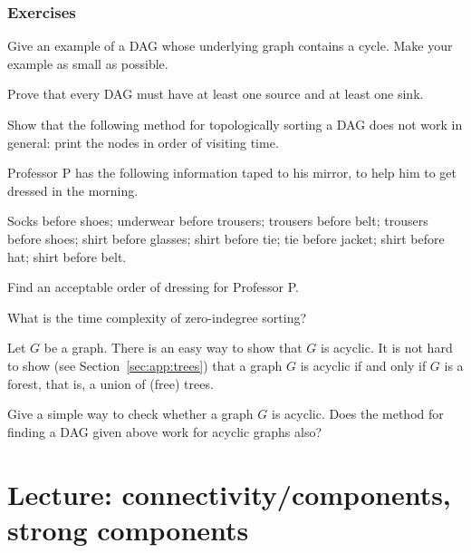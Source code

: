 \subsection*{Exercises}

\begin{Exercise}
\label{ex:DAG-vs-tree}
Give an example of a DAG whose underlying graph contains a cycle. Make
your example as small as possible.
\end{Exercise}

\begin{Exercise}
\label{ex:DAG-sink}
Prove that every DAG must have at least one source and at least one sink.
\end{Exercise}

\begin{Exercise}
\label{ex:sillytopsort}
Show that the following method for topologically sorting a DAG does not work in 
general: print the nodes in order of visiting time.
\end{Exercise}

\begin{Exercise} 
\label{ex:profP}
Professor P has the following information taped to his mirror, to help
him to get dressed in the morning.

Socks before shoes; underwear before trousers; trousers before belt;
trousers before shoes; shirt before glasses; shirt before tie; tie
before jacket; shirt before hat; shirt before belt.

Find an acceptable order of dressing for Professor P.
\end{Exercise}

\begin{Exercise}
\label{ex:zero-indeg-runtime}
What is the time complexity of zero-indegree sorting? 
\end{Exercise}


\begin{Exercise}
\label{ex:forest}
Let $G$ be a graph. There is an easy way to show that $G$ is acyclic.
It is not hard to show (see Section~\ref{sec:app:trees}) that a graph $G$ is 
acyclic if and only if $G$ is a forest, that is, a union of (free) trees.

Give a simple way to check whether a graph $G$ is acyclic. Does the method 
for finding a DAG given above work for acyclic graphs also?
\end{Exercise}

\chapter{Lecture: connectivity/components, strong components}

